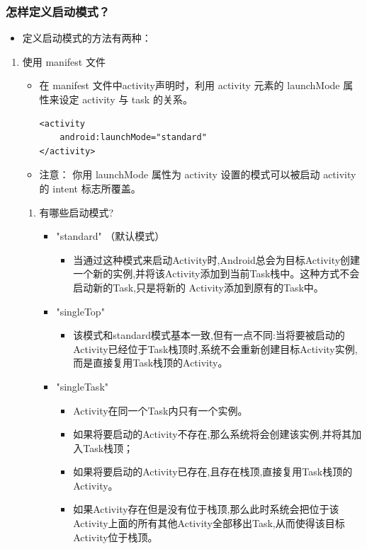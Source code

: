 \documentclass[9pt, b5paper]{article}
\begin{document}
\subsubsection{怎样定义启动模式？}
\label{sec-1-3-3}
\begin{itemize}
\item 定义启动模式的方法有两种：
\end{itemize}
\begin{enumerate}
\item 使用 manifest 文件
\label{sec-1-3-3-1}
\begin{itemize}
\item 在 manifest 文件中activity声明时，利用 activity 元素的 launchMode 属性来设定 activity 与 task 的关系。
\begin{verbatim}
<activity
    android:launchMode="standard"
</activity>
\end{verbatim}
\item 注意： 你用 launchMode 属性为 activity 设置的模式可以被启动 activity 的 intent 标志所覆盖。
\end{itemize}
\begin{enumerate}
\item 有哪些启动模式?
\label{sec-1-3-3-1-1}
\begin{itemize}
\item "standard" （默认模式）　
\begin{itemize}
\item 当通过这种模式来启动Activity时,Android总会为目标Activity创建一个新的实例,并将该Activity添加到当前Task栈中。这种方式不会启动新的Task,只是将新的 Activity添加到原有的Task中。　
\end{itemize}
\item "singleTop"　
\begin{itemize}
\item 该模式和standard模式基本一致,但有一点不同:当将要被启动的Activity已经位于Task栈顶时,系统不会重新创建目标Activity实例,而是直接复用Task栈顶的Activity。
\end{itemize}
\item "singleTask"
\begin{itemize}
\item Activity在同一个Task内只有一个实例。
\item 如果将要启动的Activity不存在,那么系统将会创建该实例,并将其加入Task栈顶；　
\item 如果将要启动的Activity已存在,且存在栈顶,直接复用Task栈顶的Activity。　
\item 如果Activity存在但是没有位于栈顶,那么此时系统会把位于该Activity上面的所有其他Activity全部移出Task,从而使得该目标Activity位于栈顶。

\end{itemize}
\end{itemize}
\end{enumerate}
\end{enumerate}
\end{document}
